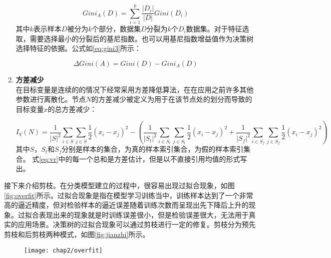 \begin{enumerate}
    {\setlength\abovedisplayskip{15pt}
    \setlength\belowdisplayskip{15pt}
    \begin{equation}
        \label{eq:gini2}
        Gini_{A}(D)=\sum_{i=1}^{k}\frac{|D_{i}|}{|D|}Gini(D_{i})
    \end{equation}}
    其中$k$表示样本$D$被分为$k$个部分，数据集$D$分裂为$k$个$D_{i}$数据集。对于特征选取，需要选择最小的分裂后的基尼指数。也可以用基尼指数增益值作为决策树选择特征的依据。公式如\ref{eq:gini3}所示：
    
    {\setlength\abovedisplayskip{15pt}
    \setlength\belowdisplayskip{15pt}
    \begin{equation}
        \label{eq:gini3}
        \Delta Gini(A)=Gini(D)-Gini_{A}(D)
    \end{equation}}
    \item \textbf{方差减少} \\
     在目标变量是连续的的情况下经常采用方差降低算法，在在应用之前许多其他参数进行离散化。节点$N$的方差减少被定义为用于在该节点处的划分而导致的目标变量$x$的总方差减少：
    
    {\setlength\abovedisplayskip{15pt}
    \setlength\belowdisplayskip{15pt}
    \begin{equation}
        \label{eq:vr}
        I_{V}(N)={\frac {1}{|S|^{2}}}\sum _{i\in S}\sum _{j\in S}{\frac {1}{2}}(x_{i}-x_{j})^{2}-\left({\frac {1}{|S_{t}|^{2}}}\sum _{i\in S_{t}}\sum _{j\in S_{t}}{\frac {1}{2}}(x_{i}-x_{j})^{2}+{\frac {1}{|S_{f}|^{2}}}\sum _{i\in S_{f}}\sum _{j\in S_{f}}{\frac {1}{2}}(x_{i}-x_{j})^{2}\right)
    \end{equation}}
    其中$S$，$S_{t}$和$S_{f}$分别是样本的集合，为真的样本索引集合，为假的样本索引集合。 式\ref{eq:vr}中的每一个总和是方差估计，但是以不直接引用均值的形式写出。  
\end{enumerate}

接下来介绍剪枝。在分类模型建立的过程中，很容易出现过拟合现象，如图\ref{fig:overfit}所示。过拟合现象是指在模型学习训练当中，训练样本达到了一个非常高的逼近精度，但对检验样本的逼近误差随着训练次数而呈现出先下降后上升的现象。过拟合表现出来的现象就是时训练误差很小，但是检验误差很大，无法用于真实的应用场景。决策树的过拟合现象可以通过剪枝进行一定的修复。剪枝分为预先剪枝和后剪枝两种模式，如图\ref{fig:jianzhi}所示。

\begin{figure}[!htp]
    \centering
    \texttt{[image: chap2/overfit]}
\end{figure}

